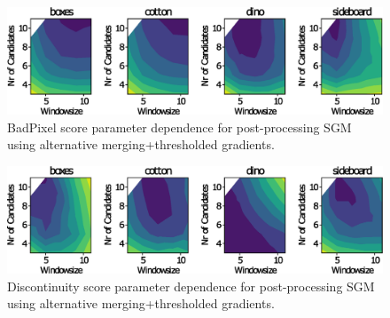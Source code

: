 \documentclass  [
  paper    = a4,
  BCOR     = 10mm,
  twoside,
  fontsize = 12pt,
  fleqn,
  toc      = bibnumbered,
  toc      = listofnumbered,
  numbers  = noendperiod,
  headings = normal,
  listof   = leveldown,
  version  = 3.03
]                                       {scrreprt}
\begin{document}
\begin{figure}[h!]
	\centering
	\includegraphics[width=1\linewidth]{images/choose_lower_sgm_ppr_contour_badpix_0070}
	\caption[BadPixel parameter dependence for post-processing SGM using alternative merging+thresholded gradients.]{BadPixel score parameter dependence for post-processing SGM using alternative merging+thresholded gradients.}
	\label{fig:chooselowersgmpprcontourbadpix_0070}
\end{figure}

\begin{figure}[h!]
	\centering
	\includegraphics[width=1\linewidth]{images/choose_lower_sgm_ppr_contour_discontinuities_0070}
	\caption[Discontinuity score parameter dependence for post-processing SGM using alternative merging+thresholded gradients.]{Discontinuity score parameter dependence for post-processing SGM using alternative merging+thresholded gradients.}
	\label{fig:chooselowersgmpprcontourbadpixel_discontinuities0070}
\end{figure}
\end{document}
